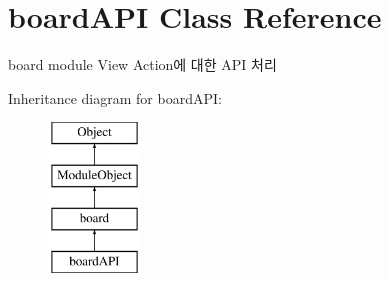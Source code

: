\hypertarget{classboardAPI}{\section{board\-A\-P\-I Class Reference}
\label{classboardAPI}
}


board module View Action에 대한 A\-P\-I 처리  


Inheritance diagram for board\-A\-P\-I\-:\begin{figure}[H]
\begin{center}
\leavevmode
\includegraphics[height=4.000000cm]{classboardAPI}
\end{center}
\end{figure}
